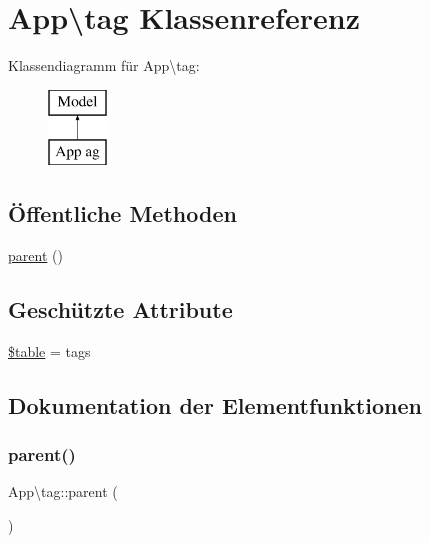 \hypertarget{classApp_1_1tag}{}\section{App\textbackslash{}tag Klassenreferenz}
\label{classApp_1_1tag}
Klassendiagramm für App\textbackslash{}tag\+:\begin{figure}[H]
\begin{center}
\leavevmode
\includegraphics[height=2.000000cm]{d1/d92/classApp_1_1tag}
\end{center}
\end{figure}
\subsection*{Öffentliche Methoden}
\begin{DoxyCompactItemize}
\item 
\hyperlink{classApp_1_1tag_a33886ccd05f6c201c47d40b02afd46f8}{parent} ()
\end{DoxyCompactItemize}
\subsection*{Geschützte Attribute}
\begin{DoxyCompactItemize}
\item 
\hyperlink{classApp_1_1tag_acfb68c9cb0029259c50fc5b63750ea4c}{\$table} = \textquotesingle{}tags\textquotesingle{}
\end{DoxyCompactItemize}


\subsection{Dokumentation der Elementfunktionen}
\mbox{\label{classApp_1_1tag_a33886ccd05f6c201c47d40b02afd46f8}} 
\subsubsection{\texorpdfstring{parent()}{parent()}}
{\footnotesize\ttfamily App\textbackslash{}tag\+::parent (\begin{DoxyParamCaption}{ }\end{DoxyParamCaption})}



